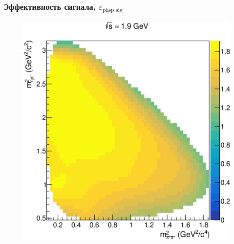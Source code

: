 \documentclass{beamer}
\begin{document}
\begin{frame}
  \frametitle{Эффективность сигнала, $\varepsilon_{\text{phsp sig}}$}
    \begin{center}
    \begin{minipage}[t]{0.4\linewidth}
      \begin{figure}
        \includegraphics[width=\linewidth]{figures/kde_xy_signal.eps}
      \end{figure}
    \end{minipage}
    \begin{minipage}[t]{0.4\linewidth}
      \begin{figure}

\end{figure}
\end{minipage}
\end{center}
\end{frame}
\end{document}
